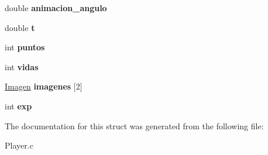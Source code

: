 \begin{DoxyCompactItemize}
\item 
\mbox{\label{struct_player_rep_a1da89b72f4e94b483293f1c6118fe049}} 
double {\bfseries animacion\+\_\+angulo}
\item 
\mbox{\label{struct_player_rep_a846e57cf82bca73fb84f2b16ac2a889c}} 
double {\bfseries t}
\item 
\mbox{\label{struct_player_rep_a5f2fe9ab2b9c4655573c5f2ff18f98a6}} 
int {\bfseries puntos}
\item 
\mbox{\label{struct_player_rep_a7684ba0122135fdb45d04b318e9e5607}} 
int {\bfseries vidas}
\item 
\mbox{\label{struct_player_rep_a69aa2cf42ba1b8842981777ea4d0df5f}} 
\mbox{\hyperlink{_pantalla_8h_a768e3409329f2389c63495f1a1684379}{Imagen}} {\bfseries imagenes} \mbox{[}2\mbox{]}
\item 
\mbox{\label{struct_player_rep_a879577cbcb0455106ce976a9776f8160}} 
int {\bfseries exp}
\end{DoxyCompactItemize}


The documentation for this struct was generated from the following file\+:\begin{DoxyCompactItemize}
\item 
Player.\+c\end{DoxyCompactItemize}
